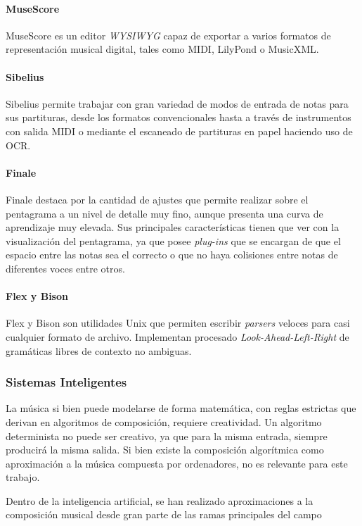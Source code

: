 \paragraph{MuseScore}
MuseScore es un editor \textit{WYSIWYG} capaz de exportar a varios formatos de representación musical digital, tales como MIDI, LilyPond o MusicXML.

\paragraph{Sibelius}
Sibelius permite trabajar con gran variedad de modos de entrada de notas para sus partituras, desde los formatos convencionales hasta a través de instrumentos con salida MIDI o mediante el escaneado de partituras en papel haciendo uso de OCR.

\paragraph{Finale}
Finale destaca por la cantidad de ajustes que permite realizar sobre el pentagrama a un nivel de detalle muy fino, aunque presenta una curva de aprendizaje muy elevada. Sus principales características  tienen que ver con la visualización del pentagrama, ya que posee \textit{plug-ins} que se encargan de que el espacio entre las notas sea el correcto o que no haya colisiones entre notas de diferentes voces entre otros.

\paragraph{Flex y Bison}
Flex y Bison son utilidades Unix que permiten escribir \textit{parsers} veloces para casi cualquier formato de archivo. Implementan procesado \textit{Look-Ahead-Left-Right} de gramáticas libres de contexto no ambiguas. 

\subsubsection{Sistemas Inteligentes}
La música si bien puede modelarse de forma matemática, con reglas estrictas que derivan en algoritmos de composición, requiere creatividad. Un algoritmo determinista no puede ser creativo, ya que para la misma entrada, siempre producirá la misma salida. Si bien existe la composición algorítmica como aproximación a la música compuesta por ordenadores, no es relevante para este trabajo.

Dentro de la inteligencia artificial, se han realizado aproximaciones a la composición musical desde gran parte de las ramas principales del campo


